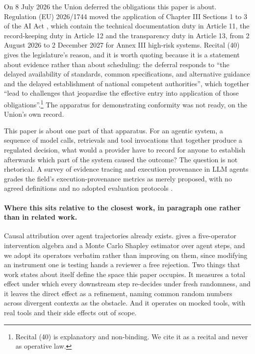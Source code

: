 \documentclass[11pt]{article}
\theoremstyle{remark}
\begin{document}
On 8 July 2026 the Union deferred the obligations this paper is about. Regulation
(EU) 2026/1744 \citep{omnibus2026} moved the application of Chapter III Sections 1
to 3 of the AI Act \citep{aiact2024},
which contain the technical documentation duty in Article 11, the record-keeping
duty in Article 12 and the transparency duty in Article 13, from 2 August 2026 to
2 December 2027 for Annex III high-risk systems. Recital (40) gives the
legislature's reason, and it is worth quoting because it is a statement about
evidence rather than about scheduling: the deferral responds to ``the delayed
availability of standards, common specifications, and alternative guidance and
the delayed establishment of national competent authorities'', which together
``lead to challenges that jeopardise the effective entry into application of those
obligations''.\footnote{Recital (40) is explanatory and non-binding. We cite it as
a recital and never as operative law.} The apparatus for demonstrating conformity
was not ready, on the Union's own record.

This paper is about one part of that apparatus. For an agentic system, a
sequence of model calls, retrievals and tool invocations that together produce a
regulated decision, what would a provider have to record for anyone to establish
afterwards which part of the system caused the outcome? The question is not
rhetorical. A survey of evidence tracing and execution provenance in LLM agents
grades the field's execution-provenance metrics as merely proposed, with no
agreed definitions and no adopted evaluation protocols \citep{survey2026}.

\paragraph{Where this sits relative to the closest work, in paragraph one rather
than in related work.} Causal attribution over agent trajectories already exists.
\citet{car2026} gives a five-operator intervention algebra and a Monte Carlo
Shapley estimator over agent steps, and we adopt its operators verbatim rather
than improving on them, since modifying an instrument one is testing hands a
reviewer a free rejection. Two things that work states about itself define the
space this paper occupies. It measures a total effect under which every
downstream step re-decides under fresh randomness, and it leaves the direct
effect as a refinement, naming common random numbers across divergent contexts as
the obstacle. And it operates on mocked tools, with real tools and their side
effects out of scope.
\end{document}
